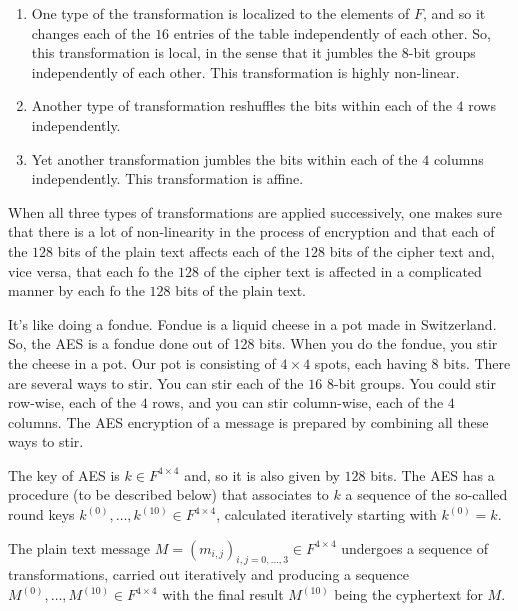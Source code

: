 \documentclass{beamer}
\begin{document}
\begin{frame}{}
	\begin{enumerate}[<+->]
	\item	One type of the transformation is  localized to the elements of $F$, and so it changes each  of the $16$ entries of the table independently of each other. So, this transformation is local, in the sense that it jumbles the $8$-bit groups independently of each other. This transformation is highly non-linear. 
	\item Another type of transformation reshuffles the bits within each of the $4$ rows independently. 
	\item Yet another transformation jumbles the bits within each of the $4$ columns independently. This transformation is affine. 
	\end{enumerate} 
\end{frame} 

\begin{frame} 
		When all three types of transformations are applied successively, one makes sure that there is a lot of non-linearity in the process of encryption and that each of the $128$ bits of the plain text affects each of the $128$ bits of the cipher text and, vice versa, that each fo the $128$ of the cipher text is affected in a complicated manner by each fo the $128$ bits of the plain text. 
\end{frame} 

\begin{frame}
	It's like doing a fondue. Fondue is a liquid cheese in a pot made in Switzerland. So, the AES is a fondue done out of 128 bits. When you do the fondue, you stir the cheese in a pot. Our pot is consisting of $4 \times 4$ spots, each having $8$ bits. There are several ways to stir. You can stir each of the $16$ $8$-bit groups. You could stir row-wise, each of the $4$ rows, and you can stir column-wise, each of the $4$ columns. The AES encryption of a message is prepared by combining all these ways to stir. 
\end{frame} 

\begin{frame} 
	The key of AES is $k \in F^{4 \times 4}$ and, so it is also given by $128$ bits. The AES has a procedure (to be described below) that associates to $k$ a sequence of the so-called round keys $k^{(0)},\ldots,k^{(10)} \in F^{4 \times 4}$, calculated iteratively starting with $k^{(0)} = k$. 
	
	\vspace{3mm}
	
	The plain text message $M = (m_{i,j})_{i,j=0,\ldots,3} \in F^{4 \times 4}$ undergoes a sequence of transformations, carried out iteratively and producing a sequence $M^{(0)},\ldots,M^{(10)} \in F^{4 \times 4}$ with the final result $M^{(10)}$ being the cyphertext for $M$. 
\end{frame} 
\end{document}
